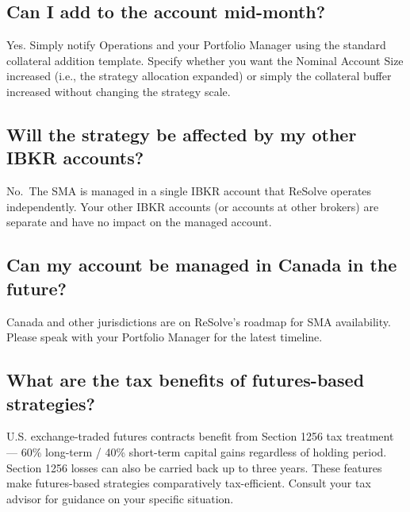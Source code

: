 \documentclass{resolve-whitepaper}
\begin{document}
\subsection{Can I add to the account
mid-month?}\label{can-i-add-to-the-account-mid-month}

Yes. Simply notify Operations and your Portfolio Manager using the
standard collateral addition template. Specify whether you want the
Nominal Account Size increased (i.e., the strategy allocation expanded)
or simply the collateral buffer increased without changing the strategy
scale.

\subsection{Will the strategy be affected by my other IBKR
accounts?}\label{will-the-strategy-be-affected-by-my-other-ibkr-accounts}

No.~The SMA is managed in a single IBKR account that ReSolve operates
independently. Your other IBKR accounts (or accounts at other brokers)
are separate and have no impact on the managed account.

\subsection{Can my account be managed in Canada in the
future?}\label{can-my-account-be-managed-in-canada-in-the-future}

Canada and other jurisdictions are on ReSolve's roadmap for SMA
availability. Please speak with your Portfolio Manager for the latest
timeline.

\subsection{What are the tax benefits of futures-based
strategies?}\label{what-are-the-tax-benefits-of-futures-based-strategies}

U.S. exchange-traded futures contracts benefit from Section 1256 tax
treatment --- 60\% long-term / 40\% short-term capital gains regardless
of holding period. Section 1256 losses can also be carried back up to
three years. These features make futures-based strategies comparatively
tax-efficient. Consult your tax advisor for guidance on your specific
situation.

\headingpagebreak

\end{document}
